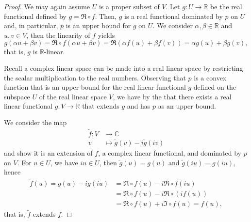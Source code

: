 \begin{proof}
    We may again assume \(U\) is a proper subset of \(V\). Let \(g : U \to \mathbb{R}\) be the real functional defined by \(g = \Re \circ f\). Then, \(g\) is a real functional dominated by \(p\) on \(U\) and, in particular, \(p\) is an upper bound for \(g\) on \(U\). We consider \(\alpha, \beta \in \mathbb{R}\) and \(u,v \in V\), then the linearity of \(f\) yields
    \begin{equation*}
        g(\alpha u + \beta v) = \Re\circ f(\alpha u + \beta v) = \Re(\alpha f(u) + \beta f(v)) = \alpha g(u) + \beta g(v),
    \end{equation*}
    that is, \(g\) is \(\mathbb{R}\)-linear.

    Recall a complex linear space can be made into a real linear space by restricting the scalar multiplication to the real numbers. Observing that \(p\) is a convex function that is an upper bound for the real linear functional \(g\) defined on the subspace \(U\) of the real linear space \(V\), we have by the  that there exists a real linear functional \(\tilde{g} : V \to \mathbb{R}\) that extends \(g\) and has \(p\) as an upper bound. 

    We consider the map
    \begin{align*}
        \tilde{f} : V &\to \mathbb{C}\\
                    v &\mapsto \tilde{g}(v) - i \tilde{g}(iv)
    \end{align*}
    and show it is an extension of \(f\), a complex linear functional, and dominated by \(p\) on \(V\). For \(u \in U\), we have \(iu \in U\), then \(\tilde{g}(u) = g(u)\) and \(\tilde{g}(iu) = g(iu)\), hence
    \begin{align*}
        \tilde{f}(u) = g(u) - i g(iu) &= \Re\circ f(u) - i \Re\circ f(iu)\\
                                      &= \Re\circ f(u) - i \Re\circ(i f(u))\\
                                      &= \Re\circ f(u) + i \Im \circ f(u) = f(u),
    \end{align*}
    that is, \(\tilde{f}\) extends \(f\).


\end{proof}
